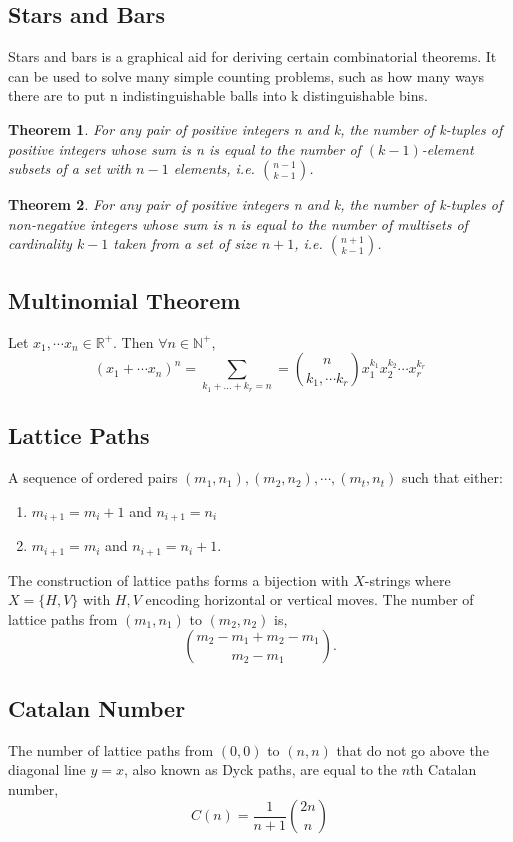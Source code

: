 \documentclass{article}
\newtheorem{theorem}{Theorem}[section]
\begin{document}
\subsection{Stars and Bars}
Stars and bars is a graphical aid for deriving certain combinatorial theorems. It can be used to solve many simple counting problems, such as how many ways there are to put n indistinguishable balls into k distinguishable bins.

\begin{theorem}
For any pair of positive integers n and k, the number of k-tuples of positive integers whose sum is n is equal to the number of $(k - 1)$-element subsets of a set with $n - 1$ elements, i.e. $\binom{n - 1}{k-1}$.
\end{theorem}

\begin{theorem}
For any pair of positive integers n and k, the number of k-tuples of non-negative integers whose sum is n is equal to the number of multisets of cardinality $k - 1$ taken from a set of size $n + 1$, i.e. $\binom{n+1}{k-1}$.

\end{theorem}


\subsection{Multinomial Theorem}
Let $x_1,\cdots x_n \in \mathbb R^+$. Then $\forall n \in \mathbb N^+$,
\[
    (x_1 + \cdots x_n)^n = \sum_{k_1 + ... + k_r = n} = \binom{n}{k_1, \cdots k_r} x_1^{k_1} x_2 ^{k_2} \cdots x_r^{k_r}
\]

\subsection{Lattice Paths}
A sequence of ordered pairs $(m_1, n_1), (m_2, n_2), \cdots, (m_t, n_t)$ such that either:
\begin{enumerate}
    \item $m_{i+1} = m_{i}+1$ and $n_{i+1} = n_{i}$
    \item $m_{i+1} = m_i$ and $n_{i+1} = n_i +1$.
\end{enumerate}
The construction of lattice paths forms a bijection with $X$-strings where $X = \{ H, V\}$ with $H,V$ encoding horizontal or vertical moves. The number of lattice paths from $(m_1, n_1)$ to $(m_2,n_2)$ is,
\[
   \binom{m_2 - m_1 + m_2 - m_1}{m_2-m_1}.
\]

\subsection{Catalan Number}
The number of lattice paths from $(0,0)$ to $(n,n)$ that do not go above the diagonal line $y = x$, also known as Dyck paths, are equal to the $n$th Catalan number,
\[
    C(n) = \frac{1}{n+1} \binom{2n}{n}
\]
\end{document}
